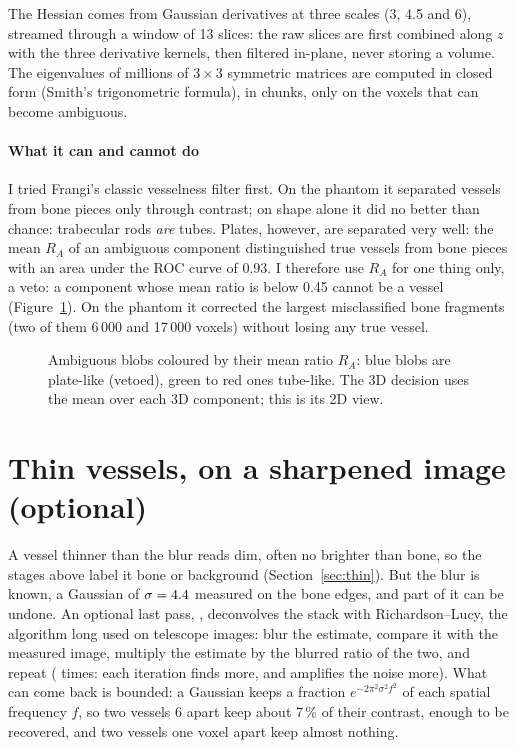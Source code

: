 The Hessian comes from Gaussian derivatives at three scales (3, 4.5 and 6\um), streamed through
a window of 13 slices: the raw slices are first combined along $z$ with the three derivative kernels,
then filtered in-plane, never storing a volume. The eigenvalues of millions of $3 \times 3$ symmetric
matrices are computed in closed form (Smith's trigonometric formula), in chunks, only on the voxels that
can become ambiguous.

\paragraph{What it can and cannot do} I tried Frangi's classic vesselness filter first. On the phantom
it separated vessels from bone pieces only through contrast; on shape alone it did no better than
chance: trabecular rods \emph{are} tubes. Plates, however, are separated very well: the mean $R_A$ of
an ambiguous component distinguished true vessels from bone pieces with an area under the ROC curve of
0.93. I therefore use $R_A$ for one thing only, a veto: a component whose mean ratio is below
0.45 cannot be a vessel (Figure~\ref{fig:tubularity}). On the phantom it corrected the largest
misclassified bone fragments (two of them 6\,000 and 17\,000 voxels) without losing any true vessel.

\begin{figure}[ht]
\centering
{}\hspace{0.05\linewidth}
\caption{Ambiguous blobs coloured by their mean ratio $R_A$: blue blobs are plate-like (vetoed),
  green to red ones tube-like. The 3D decision uses the mean over each 3D component; this is its 2D view.}
\label{fig:tubularity}
\end{figure}

\section{Thin vessels, on a sharpened image (optional)}
\label{sec:thinvessels}

A vessel thinner than the blur reads dim, often no brighter than bone, so the stages above label it
bone or background (Section~\ref{sec:thin}). But the blur is known, a Gaussian of
$\sigma = 4.4$\um{} measured on the bone edges, and part of it can be undone. An
optional last pass, , deconvolves the stack with Richardson--Lucy, the algorithm
long used on telescope images: blur the estimate, compare it with the measured image, multiply the
estimate by the blurred ratio of the two, and repeat (\pbValueExpThinIterations{} times: each
iteration finds more, and amplifies the noise more). What can come back is bounded: a Gaussian keeps
a fraction $e^{-2\pi^2\sigma^2 f^2}$ of each spatial frequency $f$, so two vessels 6\um{} apart keep
about 7\,\% of their contrast, enough to be recovered, and two vessels one voxel apart keep almost
nothing.

